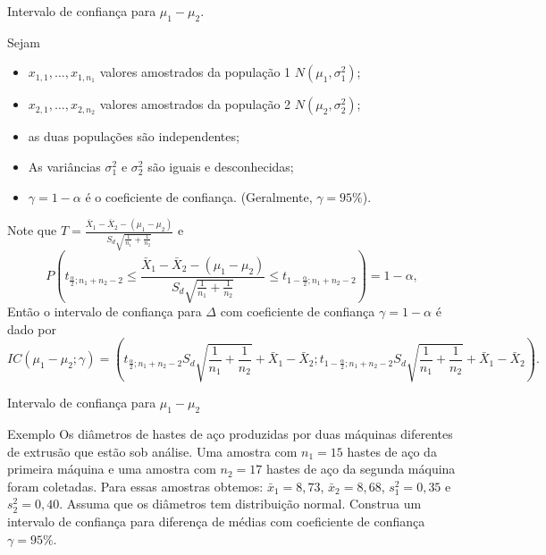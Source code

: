 \documentclass[9pt]{beamer}
\begin{document}
\begin{frame}{Intervalo de confiança para $\mu_1 - \mu_2$.}

\normalsize

Sejam
\begin{itemize}
	\item $x_{1,1}, \dots, x_{1,n_1}$ valores amostrados da população 1 $N(\mu_1, \sigma_1^2)$;
	\item $x_{2,1}, \dots, x_{2,n_2}$ valores amostrados da população 2 $N(\mu_2, \sigma_2^2)$;
	\item as duas populações são independentes;
	\item As variâncias $\sigma_1^2$ e $\sigma_2^2$ são iguais e desconhecidas; 
	\item $\gamma=1-\alpha$ é o coeficiente de confiança. (Geralmente, $\gamma=95\%$).
\end{itemize}

Note que $T = \frac{\bar{X}_1  - \bar{X}_2 -(\mu_1 - \mu_2) }{S_d\sqrt{\frac{1}{n_1} + \frac{1}{n_2}}}$ e 
$$P\left( t_{\frac{\alpha}{2}; n_1+n_2-2} \leq \frac{\bar{X}_1  - \bar{X}_2 -(\mu_1 - \mu_2) }{S_d\sqrt{\frac{1}{n_1} + \frac{1}{n_2}}} \leq t_{1-\frac{\alpha}{2}; n_1+n_2-2} \right) = 1 - \alpha,$$
Então o intervalo de confiança para $\Delta$ com coeficiente de confiança $\gamma=1-\alpha$ é dado por
{\scriptsize
	$$IC\left(\mu_1 - \mu_2; \gamma\right) = \left( t_{\frac{\alpha}{2}; n_1+n_2-2} S_d \sqrt{\frac{1}{n_1} + \frac{1}{n_2}} + \bar{X}_1 - \bar{X}_2; t_{1-\frac{\alpha}{2}; n_1+n_2-2} S_d \sqrt{\frac{1}{n_1} + \frac{1}{n_2}} + \bar{X}_1 - \bar{X}_2 \right).$$
}

\normalsize
\end{frame}




\begin{frame}{Intervalo de confiança para $\mu_1 - \mu_2$}

\large
\begin{block}{Exemplo}
	Os diâmetros de hastes de aço produzidas por duas máquinas diferentes de extrusão que estão sob análise. Uma amostra com $n_1 = 15$ hastes de aço da primeira máquina e uma amostra com $n_2=17$ hastes de aço da segunda máquina foram coletadas. Para essas amostras obtemos: $\bar{x}_1=8,73$, $\bar{x}_2=8,68$, $s_1^2=0,35$  e $s_2^2=0,40$. Assuma que os diâmetros tem distribuição normal. Construa um intervalo de confiança para diferença de médias com coeficiente de confiança $\gamma=95\%$.  
\end{block}
\normalsize

\end{frame}
\end{document}
